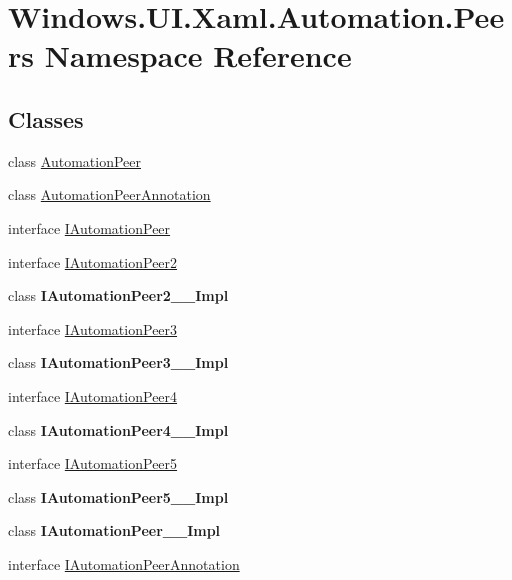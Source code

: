 \hypertarget{namespace_windows_1_1_u_i_1_1_xaml_1_1_automation_1_1_peers}{}\section{Windows.\+U\+I.\+Xaml.\+Automation.\+Peers Namespace Reference}
\label{namespace_windows_1_1_u_i_1_1_xaml_1_1_automation_1_1_peers}
\subsection*{Classes}
\begin{DoxyCompactItemize}
\item 
class \hyperlink{class_windows_1_1_u_i_1_1_xaml_1_1_automation_1_1_peers_1_1_automation_peer}{Automation\+Peer}
\item 
class \hyperlink{class_windows_1_1_u_i_1_1_xaml_1_1_automation_1_1_peers_1_1_automation_peer_annotation}{Automation\+Peer\+Annotation}
\item 
interface \hyperlink{interface_windows_1_1_u_i_1_1_xaml_1_1_automation_1_1_peers_1_1_i_automation_peer}{I\+Automation\+Peer}
\item 
interface \hyperlink{interface_windows_1_1_u_i_1_1_xaml_1_1_automation_1_1_peers_1_1_i_automation_peer2}{I\+Automation\+Peer2}
\item 
class {\bfseries I\+Automation\+Peer2\+\_\+\+\_\+\+Impl}
\item 
interface \hyperlink{interface_windows_1_1_u_i_1_1_xaml_1_1_automation_1_1_peers_1_1_i_automation_peer3}{I\+Automation\+Peer3}
\item 
class {\bfseries I\+Automation\+Peer3\+\_\+\+\_\+\+Impl}
\item 
interface \hyperlink{interface_windows_1_1_u_i_1_1_xaml_1_1_automation_1_1_peers_1_1_i_automation_peer4}{I\+Automation\+Peer4}
\item 
class {\bfseries I\+Automation\+Peer4\+\_\+\+\_\+\+Impl}
\item 
interface \hyperlink{interface_windows_1_1_u_i_1_1_xaml_1_1_automation_1_1_peers_1_1_i_automation_peer5}{I\+Automation\+Peer5}
\item 
class {\bfseries I\+Automation\+Peer5\+\_\+\+\_\+\+Impl}
\item 
class {\bfseries I\+Automation\+Peer\+\_\+\+\_\+\+Impl}
\item 
interface \hyperlink{interface_windows_1_1_u_i_1_1_xaml_1_1_automation_1_1_peers_1_1_i_automation_peer_annotation}{I\+Automation\+Peer\+Annotation}

\end{DoxyCompactItemize}
